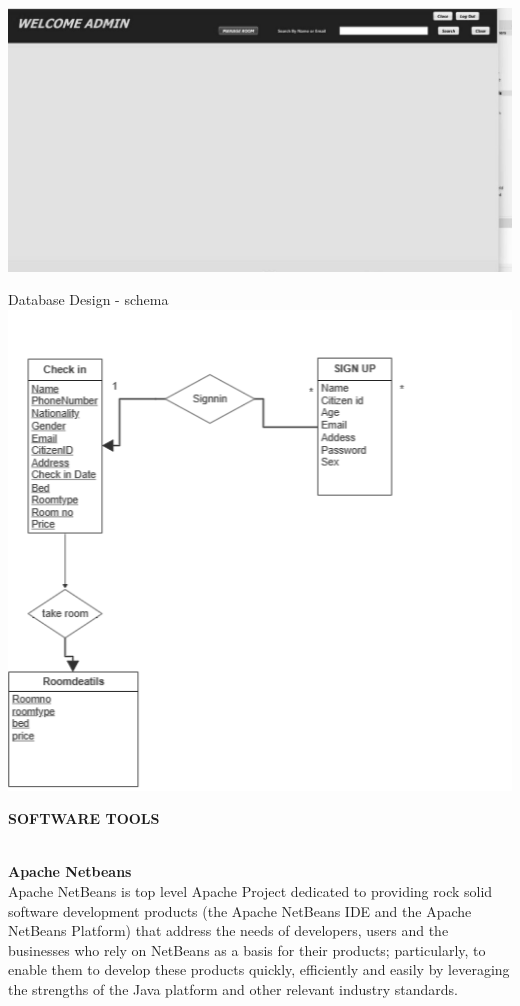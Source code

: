 \documentclass[a4paper,12pt]{report}
\begin{document}
\includegraphics[scale=0.3]{wf9.jpg}
\newpage

Database Design - schema
\\
\includegraphics[scale=0.75]{ER.png}
\begin{flushleft}
		\textbf{SOFTWARE TOOLS} 
\end{flushleft}\\


\textbf{Apache Netbeans}
\\
Apache NetBeans is top level Apache Project dedicated to providing rock solid software development products (the Apache NetBeans IDE and the Apache NetBeans Platform) that address the needs of developers, users and the businesses who rely on NetBeans as a basis for their products; particularly, to enable them to develop these products quickly, efficiently and easily by leveraging the strengths of the Java platform and other relevant industry standards.
\end{document}
